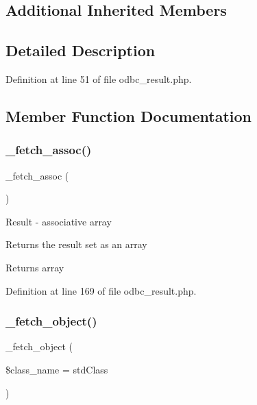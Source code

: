 \subsection*{Additional Inherited Members}


\subsection{Detailed Description}


Definition at line 51 of file odbc\+\_\+result.\+php.



\subsection{Member Function Documentation}
\mbox{\label{class_c_i___d_b__odbc__result_a43a9a92817f1334a1c10752ec44275a0}} 
\subsubsection{\texorpdfstring{\_fetch\_assoc()}{\_fetch\_assoc()}}
{\footnotesize\ttfamily \+\_\+fetch\+\_\+assoc (\begin{DoxyParamCaption}{ }\end{DoxyParamCaption})\hspace{0.3cm}{\ttfamily [protected]}}

Result -\/ associative array

Returns the result set as an array

\begin{DoxyReturn}{Returns}
array 
\end{DoxyReturn}


Definition at line 169 of file odbc\+\_\+result.\+php.

\mbox{\label{class_c_i___d_b__odbc__result_a60806be6a9c2488820813c2a7f4fef71}} 
\subsubsection{\texorpdfstring{\_fetch\_object()}{\_fetch\_object()}}
{\footnotesize\ttfamily \+\_\+fetch\+\_\+object (\begin{DoxyParamCaption}\item[{}]{\$class\+\_\+name = {\ttfamily \textquotesingle{}stdClass\textquotesingle{}} }\end{DoxyParamCaption})\hspace{0.3cm}{\ttfamily [protected]}}

